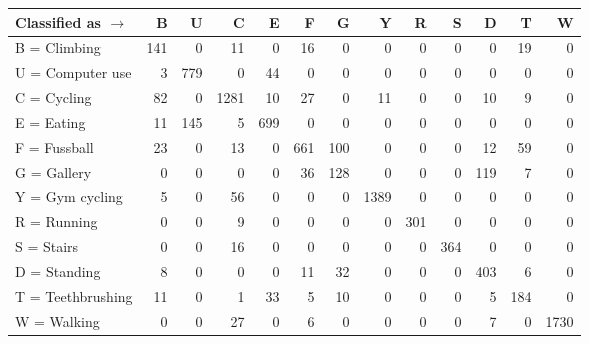 \begin{tabular}{lrrrrrrrrrrrr}
\toprule
Classified as $\rightarrow$ &    B &    U &     C &    E &    F &    G &     Y &    R &    S &    D &    T &     W \\
\midrule
B = Climbing      &  141 &    0 &    11 &    0 &   16 &    0 &     0 &    0 &    0 &    0 &   19 &     0 \\
U = Computer use  &    3 &  779 &     0 &   44 &    0 &    0 &     0 &    0 &    0 &    0 &    0 &     0 \\
C = Cycling       &   82 &    0 &  1281 &   10 &   27 &    0 &    11 &    0 &    0 &   10 &    9 &     0 \\
E = Eating        &   11 &  145 &     5 &  699 &    0 &    0 &     0 &    0 &    0 &    0 &    0 &     0 \\
F = Fussball      &   23 &    0 &    13 &    0 &  661 &  100 &     0 &    0 &    0 &   12 &   59 &     0 \\
G = Gallery       &    0 &    0 &     0 &    0 &   36 &  128 &     0 &    0 &    0 &  119 &    7 &     0 \\
Y = Gym cycling   &    5 &    0 &    56 &    0 &    0 &    0 &  1389 &    0 &    0 &    0 &    0 &     0 \\
R = Running       &    0 &    0 &     9 &    0 &    0 &    0 &     0 &  301 &    0 &    0 &    0 &     0 \\
S = Stairs        &    0 &    0 &    16 &    0 &    0 &    0 &     0 &    0 &  364 &    0 &    0 &     0 \\
D = Standing      &    8 &    0 &     0 &    0 &   11 &   32 &     0 &    0 &    0 &  403 &    6 &     0 \\
T = Teethbrushing &   11 &    0 &     1 &   33 &    5 &   10 &     0 &    0 &    0 &    5 &  184 &     0 \\
W = Walking       &    0 &    0 &    27 &    0 &    6 &    0 &     0 &    0 &    0 &    7 &    0 &  1730 \\
\bottomrule
\end{tabular}
